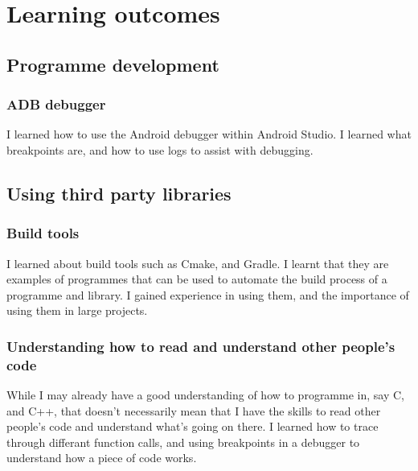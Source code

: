 \section{Learning outcomes}
    \subsection{Programme development}
        \subsubsection{ADB debugger}
        I learned how to use the Android debugger within Android Studio. I learned what breakpoints are, and how to use logs to assist with debugging.
    \subsection{Using third party libraries}
        \subsubsection{Build tools}
        I learned about build tools such as Cmake, and Gradle. I learnt that they are examples of programmes that can be used to automate the build process of a programme and library. I gained experience in using them, and the importance of using them in large projects.
        \subsubsection{Understanding how to read and understand other people's code}
        While I may already have a good understanding of how to programme in, say C, and C++, that doesn't necessarily mean that I have the skills to read other people's code and understand what's going on there. I learned how to trace through differant function calls, and using breakpoints in a debugger to understand how a piece of code works.